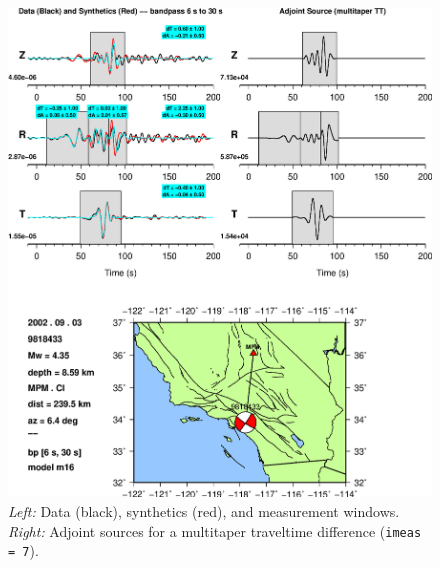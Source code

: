 \documentclass[11pt,titlepage,fleqn]{article}
\begin{document}
\begin{figure}
\includegraphics[width=17cm]{9818433_T006_T030_MPM_CI_m16_iker07_win_adj.eps}
\caption[]
{{
{\em Left:} Data (black), synthetics (red), and measurement windows.
{\em Right:} Adjoint sources for a multitaper traveltime difference ({\tt imeas = 7}).
\label{fig:iker07}
}}
\end{figure}
\end{document}
